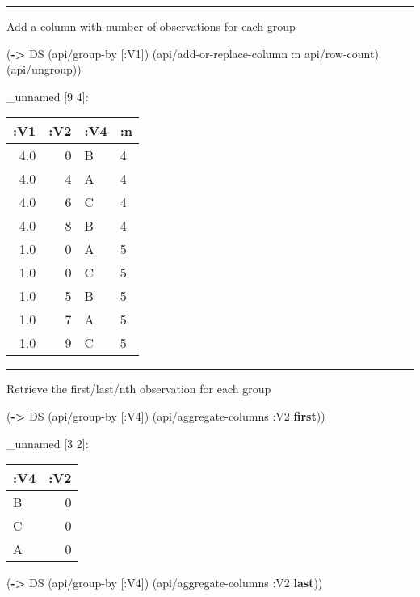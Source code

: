 \documentclass[]{article}
\newenvironment{Shaded}{\begin{snugshade}}{\end{snugshade}}
\newcommand{\KeywordTok}[1]{\textcolor[rgb]{0.13,0.29,0.53}{\textbf{#1}}}
\newcommand{\AttributeTok}[1]{\textcolor[rgb]{0.77,0.63,0.00}{#1}}
\newcommand{\NormalTok}[1]{#1}
\begin{document}
\begin{center}\rule{0.5\linewidth}{0.5pt}\end{center}

Add a column with number of observations for each group

\begin{Shaded}
\begin{Highlighting}[]
\NormalTok{(}\KeywordTok{->}\NormalTok{ DS}
\NormalTok{    (api/group-by [}\AttributeTok{:V1}\NormalTok{])}
\NormalTok{    (api/add-or-replace-column }\AttributeTok{:n}\NormalTok{ api/row-count)}
\NormalTok{    (api/ungroup))}
\end{Highlighting}
\end{Shaded}

\_unnamed {[}9 4{]}:

\begin{longtable}[]{@{}rrll@{}}
\toprule
:V1 & :V2 & :V4 & :n\tabularnewline
\midrule
\endhead
4.0 & 0 & B & 4\tabularnewline
4.0 & 4 & A & 4\tabularnewline
4.0 & 6 & C & 4\tabularnewline
4.0 & 8 & B & 4\tabularnewline
1.0 & 0 & A & 5\tabularnewline
1.0 & 0 & C & 5\tabularnewline
1.0 & 5 & B & 5\tabularnewline
1.0 & 7 & A & 5\tabularnewline
1.0 & 9 & C & 5\tabularnewline
\bottomrule
\end{longtable}

\begin{center}\rule{0.5\linewidth}{0.5pt}\end{center}

Retrieve the first/last/nth observation for each group

\begin{Shaded}
\begin{Highlighting}[]
\NormalTok{(}\KeywordTok{->}\NormalTok{ DS}
\NormalTok{    (api/group-by [}\AttributeTok{:V4}\NormalTok{])}
\NormalTok{    (api/aggregate-columns }\AttributeTok{:V2} \KeywordTok{first}\NormalTok{))}
\end{Highlighting}
\end{Shaded}

\_unnamed {[}3 2{]}:

\begin{longtable}[]{@{}lr@{}}
\toprule
:V4 & :V2\tabularnewline
\midrule
\endhead
B & 0\tabularnewline
C & 0\tabularnewline
A & 0\tabularnewline
\bottomrule
\end{longtable}

\begin{Shaded}
\begin{Highlighting}[]
\NormalTok{(}\KeywordTok{->}\NormalTok{ DS}
\NormalTok{    (api/group-by [}\AttributeTok{:V4}\NormalTok{])}
\NormalTok{    (api/aggregate-columns }\AttributeTok{:V2} \KeywordTok{last}\NormalTok{))}
\end{Highlighting}
\end{Shaded}
\end{document}
